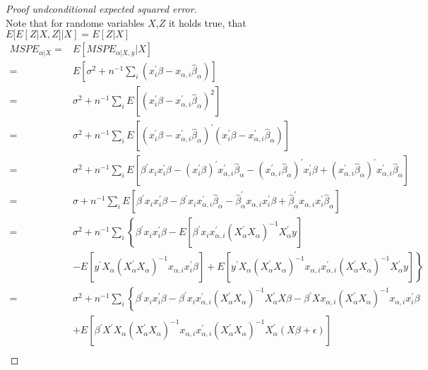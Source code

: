 \documentclass[Research_Module_ES.tex]{subfiles}
\begin{document}
\begin{proof}[Proof undconditional expected squared error] ~\\
Note that for randome variables $X$,$Z$ it holds true, that $E[E[Z|X,Z]|X]=E[Z|X]$
\begin{align*}
MSPE_{\alpha|X}=&E[MSPE_{\alpha|X,y}|X]\\
=&E\left[\sigma^2 + n^{-1}\sum_{i}^{}\left(x_i^\prime\beta - x_{\alpha,i}\hat{\beta}_\alpha\right)\right]\\
=&\sigma^2 +n^{-1}\sum_iE\left[\left(x_i^\prime\beta - x_{\alpha,i}^\prime\hat{\beta}_\alpha\right)^2\right]\\
=&\sigma^2+n^{-1}\sum_iE\left[\left(x_i^\prime\beta-x_{\alpha,i}^\prime\hat{\beta}_\alpha\right)^\prime \left(x_i^\prime\beta-x_{\alpha,i}^\prime\hat{\beta}_\alpha\right)\right]\\
=&\sigma^2 + n^{-1}\sum_iE\left[\beta^\prime x_ix_i^\prime\beta- \left(x_i^\prime\beta\right)^\prime x_{\alpha,i}^\prime\hat{\beta}_\alpha-\left(x_{\alpha,i}^\prime\hat{\beta}_\alpha \right)^\prime x_i^\prime\beta + \left(x_{\alpha,i}^\prime\hat{\beta}_\alpha\right)^\prime x_{\alpha,i}^\prime\hat{\beta}_\alpha \right]\\
=&\sigma + n^{-1} \sum_i E\left[\beta^\prime x_ix_i^\prime\beta-\beta^\prime x_i x_{\alpha,i}^\prime\hat{\beta}_\alpha -\hat{\beta}_\alpha^\prime x_{\alpha,i}x_i^\prime\beta+\hat{\beta}_\alpha^\prime x_{\alpha,i}x_i^\prime\hat{\beta}_\alpha \right]\\
=&\sigma^2+n^{-1}\sum_i\left\{ \beta^\prime x_ix_i^\prime\beta - E\left[ \beta^\prime x_i x_{\alpha,i}^\prime \left(X_\alpha^\prime X_\alpha\right)^{-1} X_\alpha^\prime y\right] \right. \\
&\left.- E\left[y^\prime X_\alpha \left(X_\alpha^\prime X_\alpha\right)^{-1}x_{\alpha,i}x_i^\prime\beta\right] +E\left[y^\prime X_\alpha \left(X_\alpha^\prime X_\alpha\right)^{-1} x_{\alpha,i}x_{\alpha,i}^\prime \left(X_\alpha^\prime X_\alpha\right)^{-1} X_\alpha^\prime y\right] \right\}\\
=&\sigma^2 + n^{-1}\sum_i\left\{\beta^\prime x_ix_i^\prime\beta- \beta^\prime x_i x_{\alpha,i}^\prime \left(X_\alpha^\prime X_\alpha\right)^{-1} X_\alpha^\prime X\beta -\beta^\prime X x_{\alpha,i} \left(X_\alpha^\prime X_\alpha\right)^{-1}x_{\alpha,i}x_i^\prime \beta \right.\\
&+\left. E\left[ \beta^\prime X^\prime X_\alpha \left(X_\alpha^\prime X_\alpha\right)^{-1} x_{\alpha,i}x_{\alpha,i}^\prime \left(X_\alpha^\prime X_\alpha\right)^{-1} X_\alpha^\prime \left(X\beta +\epsilon\right)\right] \right.\\

\end{align*}
\end{proof}
\end{document}
